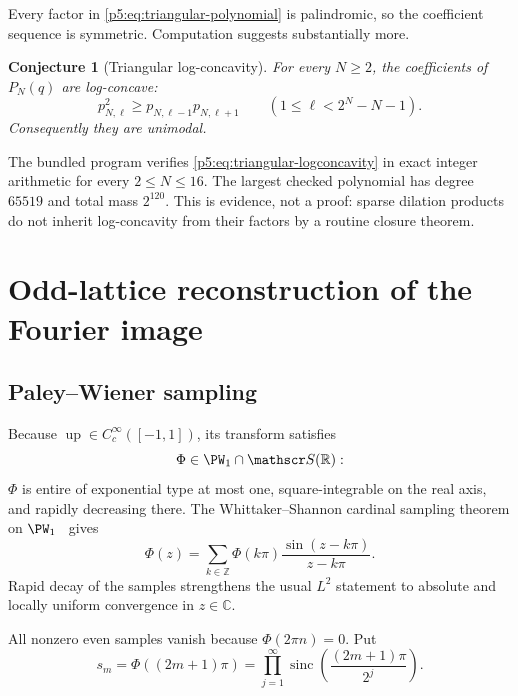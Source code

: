 \documentclass[11pt,oneside]{article}
\newtheorem{conjecture}[theorem]{Conjecture}
\theoremstyle{definition}
\newcommand{\R}{\mathbb R}
\newcommand{\C}{\mathbb C}
\newcommand{\Z}{\mathbb Z}
\newcommand{\Up}{\operatorname{up}}
\newcommand{\sinc}{\operatorname{sinc}}
\begin{document}
Every factor in \eqref{p5:eq:triangular-polynomial} is palindromic, so the
coefficient sequence is symmetric.  Computation suggests substantially more.

\begin{conjecture}[Triangular log-concavity]
\label{p5:conj:triangular-logconcavity}
For every $N\ge2$, the coefficients of $P_N(q)$ are log-concave:
\begin{equation}
 p_{N,\ell}^2\ge p_{N,\ell-1}p_{N,\ell+1}
 \qquad(1\le\ell<2^N-N-1).                              \label{p5:eq:triangular-logconcavity}
\end{equation}
Consequently they are unimodal.
\end{conjecture}

\numerical The bundled program verifies
\eqref{p5:eq:triangular-logconcavity} in exact integer arithmetic for every
$2\le N\le16$.  The largest checked polynomial has degree $65519$ and total
mass $2^{120}$.  This is evidence, not a proof: sparse dilation products do
not inherit log-concavity from their factors by a routine closure theorem.

\section{Odd-lattice reconstruction of the Fourier image}
\label{p5:sec:shannon}

\subsection{Paley--Wiener sampling}

Because $\Up\in C_c^\infty([-1,1])$, its transform satisfies
\begin{equation}
 \Phi\in\PW_1\cap\mathscr S(\R):                        \label{p5:eq:Phi-PW}
\end{equation}
$\Phi$ is entire of exponential type at most one, square-integrable on the
real axis, and rapidly decreasing there.  The Whittaker--Shannon cardinal sampling theorem on
$\PW_1$~\cite{p5:paleywiener1934,p5:whittaker1935,p5:shannon1949} gives
\begin{equation}
 \Phi(z)=\sum_{k\in\Z}\Phi(k\pi)
 \frac{\sin(z-k\pi)}{z-k\pi}.                            \label{p5:eq:shannon-full}
\end{equation}
Rapid decay of the samples strengthens the usual $L^2$ statement to absolute
and locally uniform convergence in $z\in\C$.

All nonzero even samples vanish because $\Phi(2\pi n)=0$.  Put
\begin{equation}
 s_m=\Phi((2m+1)\pi)
 =\prod_{j=1}^\infty
   \sinc\!\left(\frac{(2m+1)\pi}{2^j}\right).           \label{p5:eq:odd-samples}
\end{equation}
\end{document}
